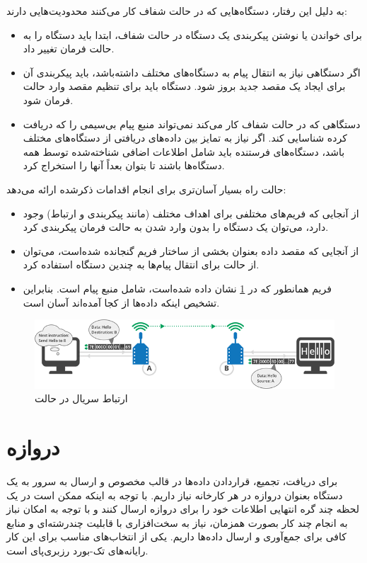 به دلیل این رفتار، دستگاه‌هایی که در حالت شفاف کار می‌کنند محدودیت‌هایی دارند:
\begin{itemize}
\item برای خواندن یا نوشتن پیکربندی یک دستگاه در حالت شفاف، ابتدا باید دستگاه را به حالت فرمان تغییر داد.
\item اگر دستگاهی نیاز به انتقال پیام به دستگاه‌های مختلف داشته‌باشد، باید پیکربندی آن برای ایجاد یک مقصد جدید بروز شود. دستگاه باید برای تنظیم مقصد وارد حالت فرمان شود.
\item دستگاهی که در حالت شفاف کار می‌کند نمی‌تواند منبع پیام بی‌سیمی را که دریافت کرده شناسایی کند. اگر نیاز به تمایز بین داده‌های دریافتی از دستگاه‌های مختلف باشد، دستگاه‌های فرستنده باید شامل اطلاعات اضافی شناخته‌شده توسط همه دستگاه‌ها باشند تا بتوان بعداً آنها را استخراج کرد.
\end{itemize}

حالت  راه بسیار آسان‌تری برای انجام اقدامات ذکرشده ارائه می‌دهد:

\begin{itemize}
\item از آنجایی که فریم‌های مختلفی برای اهداف مختلف (مانند پیکربندی و ارتباط) وجود دارد، می‌توان یک دستگاه را بدون وارد شدن به حالت فرمان پیکربندی کرد.
\item از آنجایی که مقصد داده بعنوان بخشی از ساختار فریم  گنجانده شده‌است، می‌توان از حالت  برای انتقال پیام‌ها به چندین دستگاه استفاده کرد. 
\item فریم  همانطور که در \cref{fig:api_mode} \cite{Digi} نشان داده شده‌است، شامل منبع پیام است. بنابراین تشخیص اینکه داده‌ها از کجا آمده‌اند آسان است.
\end{itemize}

\begin{figure}[!h]
\centering\includegraphics[scale=.7]{api_mode.png}
\caption{ارتباط سریال در حالت  \cite{Digi}}\label{fig:api_mode}
\end{figure}

\section{دروازه}

برای دریافت، تجمیع، قراردادن داده‌ها در قالب مخصوص و ارسال به سرور به یک دستگاه بعنوان دروازه در هر کارخانه نیاز داریم. با توجه به اینکه ممکن است در یک لحظه چند گره انتهایی اطلاعات خود را برای دروازه ارسال کنند و با توجه به امکان نباز به انجام چند کار بصورت همزمان، نیاز به سخت‌افزاری با قابلیت چند‌رشته‌ای و منابع کافی برای جمع‌آوری و ارسال داده‌ها داریم. یکی از انتخاب‌های مناسب برای این کار رایانه‌های تک-بورد رزبری‌پای است.

